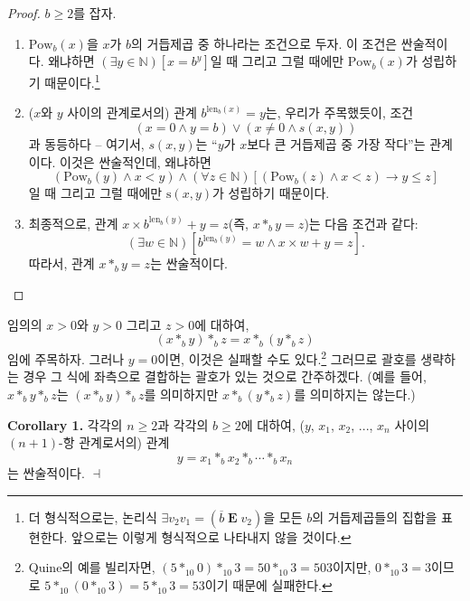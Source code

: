 \documentclass[12pt]{paper}
\newenvironment{context}[1][]
{ \noindent \textbf{{#1}.} }
{ \hfill $ \dashv $ }
\begin{document}
\begin{proof}
$b \geq 2$를 잡자.
\begin{enumerate}
\item $\mathrm{Pow}_{b} \left( x \right)$을 $x$가 $b$의 거듭제곱 중 하나라는 조건으로 두자.
이 조건은 싼술적이다. 왜냐하면 $\left( \exists y \in \mathbb{N} \right) \left[ x = b^{y} \right]$일 때 그리고 그럴 때에만 $\mathrm{Pow}_{b} \left( x \right)$가 성립하기 때문이다.\footnote
{
더 형식적으로는, 논리식 $\exists v_2 v_1 = \left( \overline{b} \mathop{\mathbf{E}} v_2 \right)$을 모든 $b$의 거듭제곱들의 집합을 표현한다.
앞으로는 이렇게 형식적으로 나타내지 않을 것이다.
}
\item ($x$와 $y$ 사이의 관계로서의) 관계 $b^{\mathrm{len}_{b} \left( x \right)} = y$는,
우리가 주목했듯이, 조건 $$ \left( x = 0 \land y = b \right) \lor \left( x \neq 0 \land s \left( x , y \right) \right) $$과 동등하다 --
여기서, $s \left( x , y \right)$는 ``$y$가 $x$보다 큰 거듭제곱 중 가장 작다''는 관계이다.
이것은 싼술적인데, 왜냐하면 $$\left( \mathrm{Pow}_{b} \left( y \right) \land x < y \right) \land \left( \forall z \in \mathbb{N} \right) \left[ \left( \mathrm{Pow}_{b} \left( z \right) \land x < z \right) \rightarrow y \leq z \right]$$일 때 그리고 그럴 때에만 $\mathrm{s} \left( x , y \right)$가 성립하기 때문이다.
\item 최종적으로, 관계 $x \times b^{\mathrm{len}_{b} \left( y \right)} + y = z$(즉, $x *_{b} y = z$)는 다음 조건과 같다:
$$ \left( \exists w \in \mathbb{N} \right) \left[ b^{\mathrm{len}_{b} \left( y \right)} = w \land x \times w + y = z \right] . $$
따라서, 관계 $x *_{b} y = z$는 싼술적이다.
\end{enumerate}
\end{proof}

임의의 $x > 0$와 $y > 0$ 그리고 $z > 0$에 대하여, $$ \left( x *_{b} y \right) *_{b} z = x *_{b} \left( y *_{b} z \right) $$임에 주목하자.
그러나 $y = 0$이면, 이것은 실패할 수도 있다.\footnote
{
Quine의 예를 빌리자면, $\left( 5 *_{10} 0 \right) *_{10} 3 = 50 *_{10} 3 = 503$이지만,
$0 *_{10} 3 = 3$이므로 $5 *_{10} \left( 0 *_{10} 3 \right) = 5 *_{10} 3 = 53$이기 때문에 실패한다.
}
그러므로 괄호를 생략하는 경우 그 식에 좌측으로 결합하는 괄호가 있는 것으로 간주하겠다.
(예를 들어, $x *_{b} y *_{b} z$는 $\left( x *_{b} y \right) *_b z$를 의미하지만 $x *_{b} \left( y *_{b} z \right)$를 의미하지는 않는다.)

\begin{context}[Corollary 1]
각각의 $n \geq 2$과 각각의 $b \geq 2$에 대하여, ($y$, $x_1$, $x_2$, ..., $x_n$ 사이의 $\left( n + 1 \right)$-항 관계로서의) 관계 $$ y = x_1 *_b x_2 *_b \cdots *_b x_n $$는 싼술적이다.
\end{context}
\end{document}
